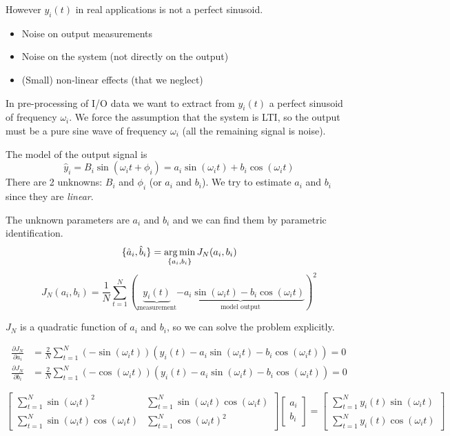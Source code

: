 However $y_i(t)$ in real applications is not a perfect sinusoid.
\begin{itemize}
    \item Noise on output measurements
    \item Noise on the system (not directly on the output)
    \item (Small) non-linear effects (that we neglect)
\end{itemize}

In pre-processing of I/O data we want to extract from $y_i(t)$ a perfect sinusoid of frequency $\omega_i$.
We force the assumption that the system is LTI, so the output must be a pure sine wave of frequency $\omega_i$ (all the remaining signal is noise).

The model of the output signal is
\[ \hat{y}_i = B_i \sin(\omega_it+\phi_i) = a_i\sin(\omega_it) + b_i\cos(\omega_it) \]
There are 2 unknowns: $B_i$ and $\phi_i$ (or $a_i$ and $b_i$).
We try to estimate $a_i$ and $b_i$ since they are \emph{linear}.

The unknown parameters are $a_i$ and $b_i$ and we can find them by parametric identification.
\[ \{ \hat{a}_i, \hat{b}_i \} = \operatorname*{arg\,min}_{\{a_i, b_i\}} J_N(a_i, b_i) \]
\[ J_N(a_i, b_i) = \frac{1}{N} \sum_{t=1}^N ( \underbrace{y_i(t)}_{\text{measurement}} \underbrace{- a_i\sin(\omega_it) - b_i\cos(\omega_it)}_\text{model output})^2 \]

$J_N$ is a quadratic function of $a_i$ and $b_i$, so we can solve the problem explicitly.

\begin{align*}
    \frac{\partial J_N}{\partial a_i} &= \frac{2}{N} \sum_{t=1}^N (-\sin(\omega_it))(y_i(t) - a_i\sin(\omega_it)-b_i\cos(\omega_it)) = 0 \\
    \frac{\partial J_N}{\partial b_i} &= \frac{2}{N} \sum_{t=1}^N (-\cos(\omega_it))(y_i(t) - a_i\sin(\omega_it)-b_i\cos(\omega_it)) = 0
\end{align*}

\[
    \begin{bmatrix}
        \sum_{t=1}^N \sin(\omega_it)^2 & \sum_{t=1}^N \sin(\omega_it)\cos(\omega_it) \\
        \sum_{t=1}^N \sin(\omega_it)\cos(\omega_it) & \sum_{t=1}^N \cos(\omega_it)^2
    \end{bmatrix}
    \begin{bmatrix}
        a_i \\ b_i
    \end{bmatrix} =
    \begin{bmatrix}
        \sum_{t=1}^N y_i(t)\sin(\omega_it) \\
        \sum_{t=1}^N y_i(t)\cos(\omega_it)
    \end{bmatrix}
\]

